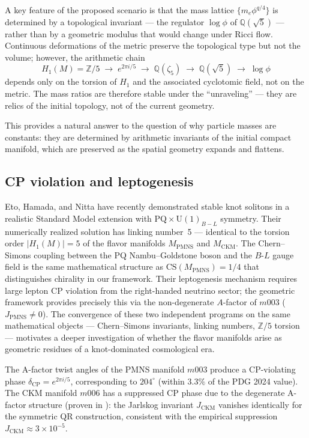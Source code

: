 ﻿\documentclass[12pt]{article}
\theoremstyle{definition}
\begin{document}
A key feature of the proposed scenario is that the mass lattice
$\{m_e \phi^{q/4}\}$ is determined by a topological invariant ---
the regulator $\log\phi$ of $\mathbb{Q}(\sqrt{5})$ --- rather than
by a geometric modulus that would change under Ricci flow. Continuous
deformations of the metric preserve the topological type but not
the volume; however, the arithmetic chain
\[
  H_1(M) = \mathbb{Z}/5 \;\longrightarrow\; e^{2\pi i/5}
  \;\longrightarrow\; \mathbb{Q}(\zeta_5)
  \;\longrightarrow\; \mathbb{Q}(\sqrt{5})
  \;\longrightarrow\; \log\phi
\]
depends only on the torsion of $H_1$ and the associated cyclotomic
field, not on the metric. The mass ratios are therefore stable under
the ``unraveling'' --- they are relics of the initial topology, not
of the current geometry.

This provides a natural answer to the question of why particle
masses are constants: they are determined by arithmetic invariants
of the initial compact manifold, which are preserved as the spatial
geometry expands and flattens.

\subsection{CP violation and leptogenesis}

Eto, Hamada, and Nitta \cite{Eto2025} have recently demonstrated stable knot
solitons in a realistic Standard Model extension with $\mathrm{PQ} \times
\mathrm{U}(1)_{B-L}$ symmetry. Their numerically realized solution has linking
number~5 --- identical to the torsion order $|H_1(M)| = 5$ of the flavor
manifolds $M_{\mathrm{PMNS}}$ and $M_{\mathrm{CKM}}$. The Chern--Simons
coupling between the PQ Nambu--Goldstone boson and the $B$-$L$ gauge field
is the same mathematical structure as $\mathrm{CS}(M_{\mathrm{PMNS}}) = 1/4$
that distinguishes chirality in our framework. Their leptogenesis mechanism
requires large lepton CP violation from the right-handed neutrino sector; the
geometric framework provides precisely this via the non-degenerate $A$-factor
of $m003$ ($J_{\mathrm{PMNS}} \neq 0$). The convergence of these two
independent programs on the same mathematical objects --- Chern--Simons
invariants, linking numbers, $\mathbb{Z}/5$ torsion --- motivates a deeper
investigation of whether the flavor manifolds arise as geometric residues of
a knot-dominated cosmological era.



The A-factor twist angles of the PMNS manifold $m003$ produce a
CP-violating phase $\delta_\mathrm{CP} = e^{2\pi i/5}$, corresponding
to $204^\circ$ (within $3.3\%$ of the PDG 2024 value). The CKM
manifold $m006$ has a suppressed CP phase due to the degenerate
A-factor structure (proven in \cite{Gentry:CP}): the Jarlskog
invariant $J_\mathrm{CKM}$ vanishes identically for the symmetric QR
construction, consistent with the empirical suppression
$J_\mathrm{CKM} \approx 3 \times 10^{-5}$.
\end{document}
